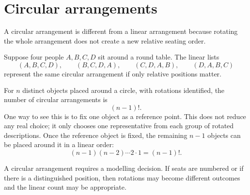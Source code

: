 \section{Circular arrangements}

A circular arrangement is different from a linear arrangement because rotating the whole arrangement does not create a new relative seating order.

\begin{examplebox}
Suppose four people \(A,B,C,D\) sit around a round table. The linear lists
\[
(A,B,C,D),\qquad (B,C,D,A),\qquad (C,D,A,B),\qquad (D,A,B,C)
\]
represent the same circular arrangement if only relative positions matter.
\end{examplebox}

For \(n\) distinct objects placed around a circle, with rotations identified, the number of circular arrangements is
\[
(n-1)!.
\]
One way to see this is to fix one object as a reference point. This does not reduce any real choice; it only chooses one representative from each group of rotated descriptions. Once the reference object is fixed, the remaining \(n-1\) objects can be placed around it in a linear order:
\[
(n-1)(n-2)\cdots 2\cdot 1=(n-1)!.
\]

\begin{remarkbox}
A circular arrangement requires a modelling decision. If seats are numbered or if there is a distinguished position, then rotations may become different outcomes and the linear count may be appropriate.
\end{remarkbox}
